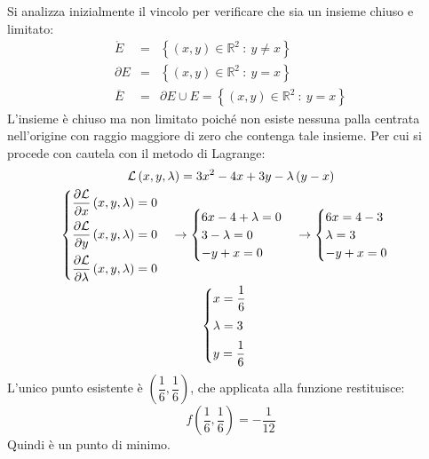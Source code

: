 \documentclass[a4paper]{article}
\begin{document}
	\noindent
	Si analizza inizialmente il vincolo per verificare che sia un insieme chiuso e limitato:
	\begin{equation*}
		\begin{array}{rcl}
			\mathring{E} &=& \left\{\left(x,y\right) \in \mathbb{R}^{2} \: : \: y \ne x\right\} \\ [.3em]
			\partial E &=& \left\{\left(x,y\right) \in \mathbb{R}^{2} \: : \: y = x\right\} \\ [.3em]
			\overline{E} &=& \partial E \cup E = \left\{\left(x,y\right) \in \mathbb{R}^{2} \: : \: y = x\right\}
		\end{array}
	\end{equation*}
	L'insieme è chiuso ma non limitato poiché non esiste nessuna palla centrata nell'origine con raggio maggiore di zero che contenga tale insieme. Per cui si procede con cautela con il metodo di Lagrange:
	\begin{gather*}
		\mathcal{L}\left(x,y,\lambda\right) = 3x^{2} - 4x + 3y - \lambda\left(y-x\right)
		\\
		\begin{cases}
			\dfrac{\partial \mathcal{L}}{\partial x}\left(x,y,\lambda\right) = 0 \vspace{.5em} \\
			\dfrac{\partial \mathcal{L}}{\partial y}\left(x,y,\lambda\right) = 0 \vspace{.5em} \\
			\dfrac{\partial \mathcal{L}}{\partial \lambda}\left(x,y,\lambda\right) = 0
		\end{cases}
		\rightarrow
		\begin{cases}
			6x - 4 + \lambda = 0 \\
			3 - \lambda = 0 \\
			-y+x = 0
		\end{cases}
		\rightarrow
		\begin{cases}
			6x = 4 - 3 \\
			\lambda = 3 \\
			-y+x = 0
		\end{cases}
		\\
		\begin{cases}
			x = \dfrac{1}{6} \vspace{.5em} \\
			\lambda = 3 \vspace{.5em} \\
			y = \dfrac{1}{6}
		\end{cases}
	\end{gather*}
	L'unico punto esistente è $\left(\dfrac{1}{6},\dfrac{1}{6}\right)$, che applicata alla funzione restituisce:
	\begin{equation*}
		f\left(\dfrac{1}{6},\dfrac{1}{6}\right) = -\dfrac{1}{12}
	\end{equation*}
	Quindi è un punto di minimo.
\end{document}
